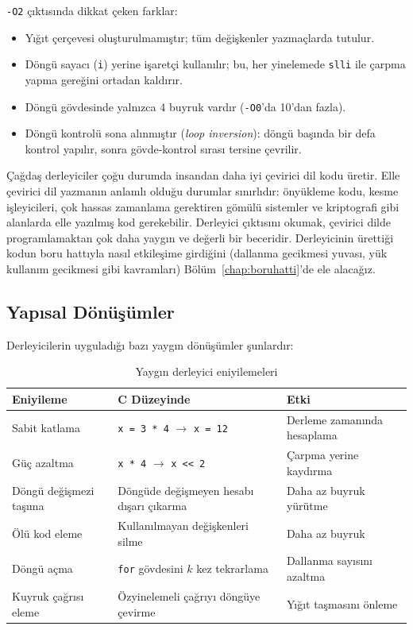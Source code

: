 \begin{ornek}[4.16]
\texttt{-O2} çıktısında dikkat çeken farklar:
\begin{itemize}
\item Yığıt çerçevesi oluşturulmamıştır; tüm değişkenler yazmaçlarda tutulur.
\item Döngü sayacı (\texttt{i}) yerine işaretçi kullanılır; bu, her yinelemede \texttt{slli} ile çarpma yapma gereğini ortadan kaldırır.
\item Döngü gövdesinde yalnızca 4 buyruk vardır (\texttt{-O0}'da 10'dan fazla).
\item Döngü kontrolü sona alınmıştır (\emph{loop inversion}): döngü başında bir defa kontrol yapılır, sonra gövde-kontrol sırası tersine çevrilir.
\end{itemize}
\end{ornek}

\begin{bilginot}
Çağdaş derleyiciler çoğu durumda insandan daha iyi çevirici dil kodu üretir. Elle çevirici dil yazmanın anlamlı olduğu durumlar sınırlıdır: önyükleme kodu, kesme işleyicileri, çok hassas zamanlama gerektiren gömülü sistemler ve kriptografi gibi alanlarda elle yazılmış kod gerekebilir. Derleyici çıktısını okumak, çevirici dilde programlamaktan çok daha yaygın ve değerli bir beceridir. Derleyicinin ürettiği kodun boru hattıyla nasıl etkileşime girdiğini (dallanma gecikmesi yuvası, yük kullanım gecikmesi gibi kavramları) Bölüm~\ref{chap:boruhatti}'de ele alacağız.
\end{bilginot}


\subsection{Yapısal Dönüşümler}
\label{subsec:yapisal-donusumler}

Derleyicilerin uyguladığı bazı yaygın dönüşümler şunlardır:

\begin{table}[H]
\centering
\caption[Yaygın derleyici eniyilemeleri]{Yaygın derleyici eniyilemeleri}
\label{tab:derleyici-eniyilemeleri}
\small
\begin{tabularx}{\textwidth}{l X X}
\toprule
\textbf{Eniyileme} & \textbf{C Düzeyinde} & \textbf{Etki} \\
\midrule
Sabit katlama & \texttt{x = 3 * 4} $\rightarrow$ \texttt{x = 12} & Derleme zamanında hesaplama \\
Güç azaltma & \texttt{x * 4} $\rightarrow$ \texttt{x << 2} & Çarpma yerine kaydırma \\
Döngü değişmezi taşıma & Döngüde değişmeyen hesabı dışarı çıkarma & Daha az buyruk yürütme \\
Ölü kod eleme & Kullanılmayan değişkenleri silme & Daha az buyruk \\
Döngü açma & \texttt{for} gövdesini $k$ kez tekrarlama & Dallanma sayısını azaltma \\
Kuyruk çağrısı eleme & Özyinelemeli çağrıyı döngüye çevirme & Yığıt taşmasını önleme \\
\bottomrule
\end{tabularx}
\end{table}

